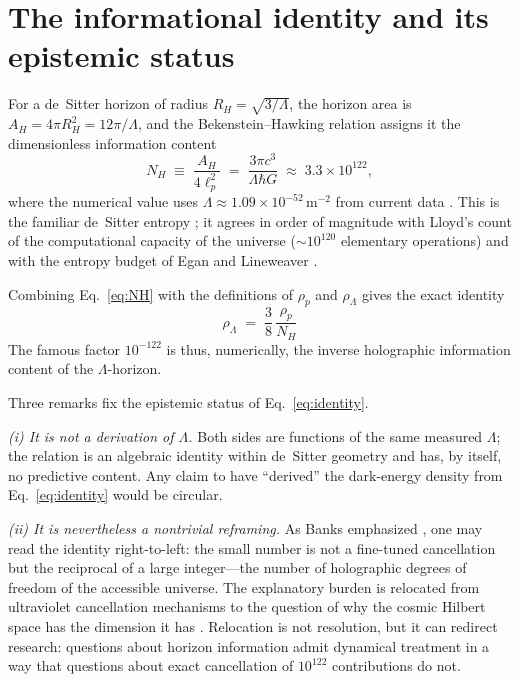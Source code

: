 \documentclass[11pt,a4paper]{article}
\begin{document}
\section{The informational identity and its epistemic status}
\label{sec:identity}

For a de~Sitter horizon of radius $R_H = \sqrt{3/\Lambda}$, the horizon area
is $A_H = 4\pi R_H^2 = 12\pi/\Lambda$, and the Bekenstein--Hawking relation
assigns it the dimensionless information content
\begin{equation}
N_H \;\equiv\; \frac{A_H}{4\ell_p^2}
\;=\; \frac{3\pi c^3}{\Lambda \hbar G}
\;\approx\; 3.3\times 10^{122},
\label{eq:NH}
\end{equation}
where the numerical value uses $\Lambda \approx 1.09\times10^{-52}\,
\mathrm{m^{-2}}$ from current data \citep{Planck2018,DESIDR2}. This is the
familiar de~Sitter entropy \citep{GibbonsHawking1977}; it agrees in order of
magnitude with Lloyd's count of the computational capacity of the universe
($\sim 10^{120}$ elementary operations) \citep{Lloyd2002} and with the
entropy budget of Egan and Lineweaver \citep{EganLineweaver2010}.

Combining Eq.~\eqref{eq:NH} with the definitions of $\rho_p$ and
$\rho_\Lambda$ gives the exact identity
\begin{equation}
\boxed{\;\rho_\Lambda \;=\; \frac{3}{8}\,\frac{\rho_p}{N_H}\;}
\label{eq:identity}
\end{equation}
The famous factor $10^{-122}$ is thus, numerically, the inverse holographic
information content of the $\Lambda$-horizon.

Three remarks fix the epistemic status of Eq.~\eqref{eq:identity}.

\emph{(i) It is not a derivation of $\Lambda$.} Both sides are functions of
the same measured $\Lambda$; the relation is an algebraic identity within
de~Sitter geometry and has, by itself, no predictive content. Any claim to
have ``derived'' the dark-energy density from
Eq.~\eqref{eq:identity} would be circular.

\emph{(ii) It is nevertheless a nontrivial reframing.} As Banks emphasized
\citep{Banks2000}, one may read the identity right-to-left: the small number
is not a fine-tuned cancellation but the reciprocal of a large integer---the
number of holographic degrees of freedom of the accessible universe. The
explanatory burden is relocated from ultraviolet cancellation mechanisms to
the question of why the cosmic Hilbert space has the dimension it has
\citep{CosMIn2013}. Relocation is not resolution, but it can redirect
research: questions about horizon information admit dynamical treatment in a
way that questions about exact cancellation of $10^{122}$ contributions do
not.
\end{document}
